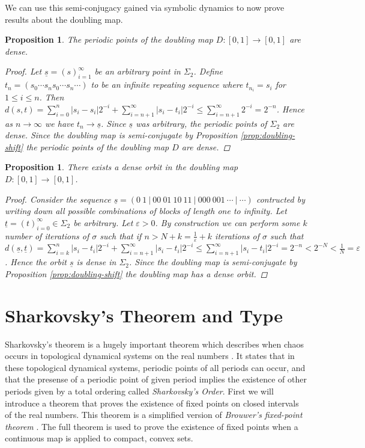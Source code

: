 \documentclass[11pt,a4paper,oneside]{memoir}
\theoremstyle{plain}
\newtheorem{prop}[thm]{Proposition}
\theoremstyle{definition}
\begin{document}
We can use this semi-conjugacy gained via symbolic dynamics to now prove results about the doubling map. 

\begin{prop}
    The periodic points of the doubling map $D: [0, 1] \to [0, 1]$ are dense.
    \begin{proof}
        Let $\underline{s} = (s)_{i=1}^{\infty}$ be an arbitrary point in $\Sigma_2$. Define $t_n = (s_0\cdots s_ns_0\cdots s_n\cdots)$ to be an infinite repeating sequence where $t_{n_i} = s_i$ for $1 \leq i \leq n$. Then $d(s, t) = \sum_{i = 0}^n|s_i - s_i|2^{-i} + \sum_{i=n+1}^{\infty}|s_i - t_i|2^{-i} \leq \sum_{i = n+1}^{\infty}2^{-i} = 2^{-n}$. Hence as $n \to \infty$ we have $t_n \to \underline{s}$. Since $\underline{s}$ was arbitrary, the periodic points of $\Sigma_2$ are dense. Since the doubling map is semi-conjugate by Proposition \ref{prop:doubling-shift} the periodic points of the doubling map $D$ are dense.
    \end{proof}
\end{prop}

\begin{prop}
    There exists a dense orbit in the doubling map $D: [0, 1] \to [0, 1]$.
    \begin{proof}
        Consider the sequence $\underline{s} = (0\ 1\ |\ 00\ 01\ 10\ 11\ |\ 000\ 001\ \cdots\ |\ \cdots)$ contructed by writing down all possible combinations of blocks of length one to infinity. Let $\underline{t} = (t)_{i=0}^{\infty} \in \Sigma_2$ be arbitrary. Let $\varepsilon > 0$. By construction we can perform some $k$ number of iterations of $\sigma$ such that if $n > N + k = \frac{1}{\varepsilon} + k$ iterations of $\sigma$ such that $d(\underline{s}, \underline{t}) = \sum_{i = k}^{n}|s_i - t_i|2^{-i} + \sum_{i = n+1}^{\infty}|s_i - t_i|2^{-i} \leq \sum_{i = n+1}^{\infty}|s_i - t_i|2^{-i} = 2^{-n} < 2^{-N} < \frac{1}{N} = \varepsilon$. Hence the orbit $\underline{s}$ is dense in $\Sigma_2$. Since the doubling map is semi-conjugate by Proposition \ref{prop:doubling-shift} the doubling map has a dense orbit.
    \end{proof}
\end{prop}

\section{Sharkovsky's Theorem and Type}\label{sec:sharkovsky}
Sharkovsky's theorem is a hugely important theorem which describes when chaos occurs in topological dynamical systems on the real numbers \cite{sharkovsky}. It states that in these topological dynamical systems, periodic points of all periods can occur, and that the presense of a periodic point of given period implies the existence of other periods given by a total ordering called \emph{Sharkovsky's Order}. First we will introduce a theorem that proves the existence of fixed points on closed intervals of the real numbers. This theorem is a simplified version of \emph{Brouwer's fixed-point theorem} \cite{brouwer}. The full theorem is used to prove the existence of fixed points when a continuous map is applied to compact, convex sets.
\end{document}
